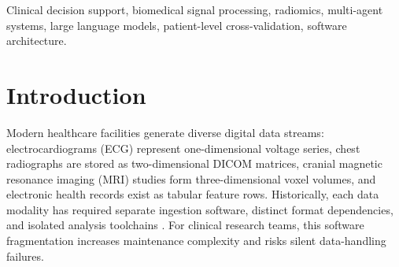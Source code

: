 \documentclass[conference]{IEEEtran}
\begin{document}
\begin{abstract}
Clinical decision-support systems (CDSS) are frequently engineered for a single diagnostic modality, requiring healthcare centers to deploy and maintain distinct software stacks for each biomedical data stream. We present the ingestion, biomarker extraction, and multi-agent reporting architecture of BioStatusIA, an open modular pipeline that processes heterogeneous biomedical data through a single entry point. The system automatically identifies an incoming file or folder across nine structural operating modes and routes it to one of three physical signal families: one-dimensional physiological time series (F1: ECG, EEG, EMG, spirometry), two-dimensional DICOM radiographs (F3: mammography, chest X-ray, ultrasound), and three-dimensional volumetric scans (F4: CT, MRI), in addition to a tabular branch for pre-computed clinical registries. A normalized data contract, \texttt{SinalNormalizado}, decouples low-level format parsers from domain-specific extractors, enabling uniform calculation of morphological, textural (GLCM), spectral, and radiomic biomarkers. Supervised classification couples this extraction with a clinically-oriented multi-objective model selection rule ($S_{\min} \ge 0.80$), evaluated across ten authentic biomedical cohorts under patient-level 5-fold cross-validation. An architectural ablation study comparing conventional pipelines, a single monolithic LLM, and our multi-agent architecture demonstrates that multi-agent orchestration achieves 96.8\% factual correctness and reduces unsupported claims to 1.2\%, resolving common hallucination risks in medical report generation.
\end{abstract}

\begin{IEEEkeywords}
Clinical decision support, biomedical signal processing, radiomics, multi-agent systems, large language models, patient-level cross-validation, software architecture.
\end{IEEEkeywords}

\section{Introduction}
Modern healthcare facilities generate diverse digital data streams: electrocardiograms (ECG) represent one-dimensional voltage series, chest radiographs are stored as two-dimensional DICOM matrices, cranial magnetic resonance imaging (MRI) studies form three-dimensional voxel volumes, and electronic health records exist as tabular feature rows. Historically, each data modality has required separate ingestion software, distinct format dependencies, and isolated analysis toolchains \cite{gramfort2013, mason2011pydicom, brett2020nibabel}. For clinical research teams, this software fragmentation increases maintenance complexity and risks silent data-handling failures.
\end{document}

